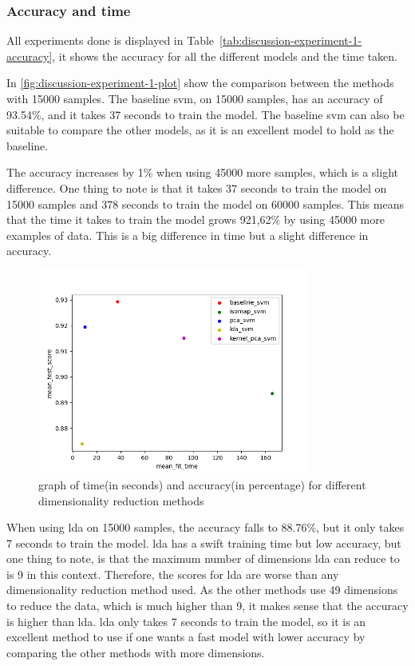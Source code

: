 \subsubsection{Accuracy and time}\label{subsec:discussion-experiment-1-accuracy}
All experiments done is displayed in Table~\ref{tab:discussion-experiment-1-accuracy}, it shows the accuracy for all the different models and the time taken.



In \autoref{fig:discussion-experiment-1-plot} show the comparison between the methods with 15000 samples. The baseline \gls{svm}, on 15000 samples, has an accuracy of 93.54\%, and it takes 37 seconds to train the model. The baseline \gls{svm} can also be suitable to compare the other models, as it is an excellent model to hold as the baseline.

The accuracy increases by 1\% when using 45000 more samples, which is a slight difference. One thing to note is that it takes 37 seconds to train the model on 15000 samples and 378 seconds to train the model on 60000 samples. This means that the time it takes to train the model grows 921,62\% by using 45000 more examples of data. This is a big difference in time but a slight difference in accuracy.


\begin{figure}[htb!]
    \centering
    \includegraphics[width=0.8\textwidth]{figures/1-experiment/experiment1_plot.png}
    \caption{graph of time(in seconds) and accuracy(in percentage) for different dimensionality reduction methods}
    \label{fig:discussion-experiment-1-plot}
\end{figure}


When using \gls{lda} on 15000 samples, the accuracy falls to 88.76\%, but it only takes 7 seconds to train the model. \gls{lda} has a swift training time but low accuracy, but one thing to note, is that the maximum number of dimensions \gls{lda} can reduce to is 9 in this context. Therefore, the scores for \gls{lda} are worse than any dimensionality reduction method used. As the other methods use 49 dimensions to reduce the data, which is much higher than 9, it makes sense that the accuracy is higher than \gls{lda}. \gls{lda} only takes 7 seconds to train the model, so it is an excellent method to use if one wants a fast model with lower accuracy by comparing the other methods with more dimensions.

